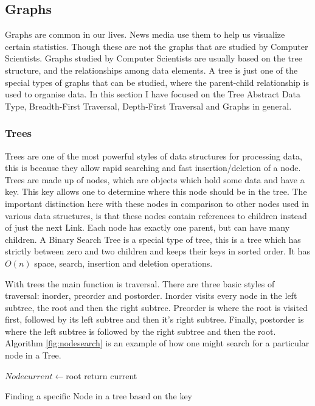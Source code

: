 \documentclass[10pt,twocolumn,hidelinks]{IEEEtran}
\begin{document}
	\subsection{Graphs}
	Graphs are common in our lives. News media use them to help us visualize certain statistics. Though these are not the graphs that are studied by Computer Scientists. Graphs studied by Computer Scientists are usually based on the tree structure, and the relationships 	among data elements. A tree is just one of the special types of graphs that can be studied, where the parent-child relationship is used to organise data. In this section I have focused on the Tree Abstract Data Type, Breadth-First Traversal, Depth-First Traversal and Graphs in general. \\
	\subsubsection{Trees}
	Trees are one of the most powerful styles of data structures for processing data, this is because they allow rapid searching and fast insertion/deletion of a node. Trees are made up of nodes, which are objects which hold some data and have a key. This key allows one to determine where this node should be in the tree. The important distinction here with these nodes in comparison to other nodes used in various data structures, is that these nodes contain references to children instead of just the next Link. Each node has exactly one parent, but can have many children. A Binary Search Tree is a special type of tree, this is a tree which has strictly between zero and two children and keeps their keys in sorted order. It has $O(n)$ space, search, insertion and deletion operations. 
	\par With trees the main function is traversal. There are three basic styles of traversal: inorder, preorder and postorder. Inorder visits every node in the left subtree, the root and then the right subtree. Preorder is where the root is visited first, followed by its left subtree and then it's right subtree. Finally, postorder is where the left subtree is followed by the right subtree and then the root. \\
Algorithm \ref{fig:nodesearch} is an example of how one might search for a particular node in a Tree.\\
\IncMargin{1em}
\begin{algorithm}
	\SetAlgoLined
	$Node current \longleftarrow$root\;
return current\;
\caption{Finding a specific Node in a tree based on the key}
\label{fig:nodesearch}
\end{algorithm}\DecMargin{1em}
\end{document}
